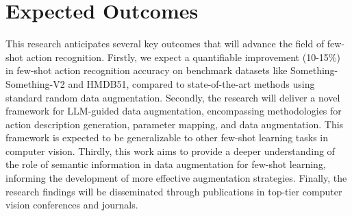 \section*{ Expected Outcomes}

This research anticipates several key outcomes that will advance the field of few-shot action recognition. Firstly, we expect a quantifiable improvement (10-15\%) in few-shot action recognition accuracy on benchmark datasets like Something-Something-V2 and HMDB51, compared to state-of-the-art methods using standard random data augmentation. Secondly, the research will deliver a novel framework for LLM-guided data augmentation, encompassing methodologies for action description generation, parameter mapping, and data augmentation. This framework is expected to be generalizable to other few-shot learning tasks in computer vision. Thirdly, this work aims to provide a deeper understanding of the role of semantic information in data augmentation for few-shot learning, informing the development of more effective augmentation strategies. Finally, the research findings will be disseminated through publications in top-tier computer vision conferences and journals.